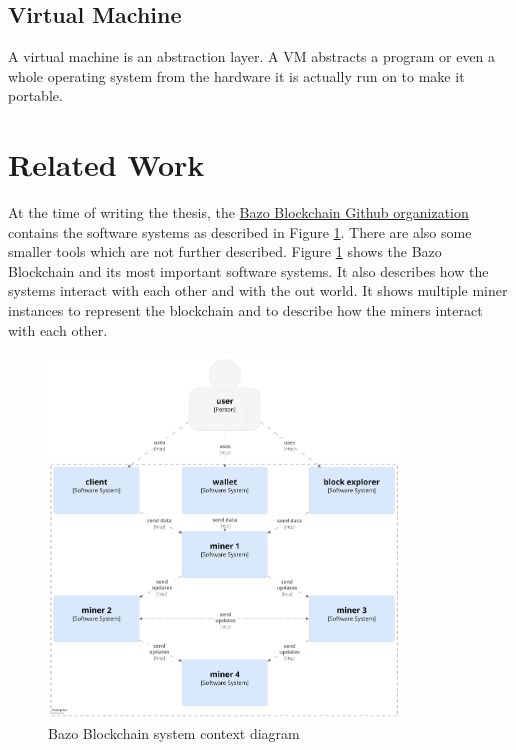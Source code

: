 \subsection{Virtual Machine}
A virtual machine is an abstraction layer. A VM abstracts a program or even a whole operating system from the hardware it is actually run on to make it portable.

\section{Related Work}
At the time of writing the thesis, the \href{https://github.com/bazo-blockchain}{Bazo Blockchain Github organization} contains the software systems as described in Figure \ref{systemcontextdiagram}. There are also some smaller tools which are not further described. Figure \ref{systemcontextdiagram} shows the Bazo Blockchain and its most important software systems.  It also describes how the systems interact with each other and with the out world. It shows multiple miner instances to represent the blockchain and to describe how the miners interact with each other.

\begin{figure}[H]
	\begin{center}
	\includegraphics[width=0.83\textwidth]{./images/BAZO_System_Context}
	\caption{Bazo Blockchain system context diagram}
	\label{systemcontextdiagram}
	\end{center}
\end{figure}

